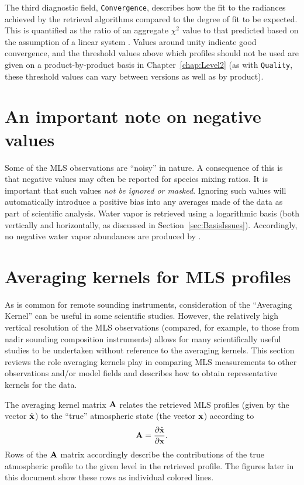 The third diagnostic field, \texttt{Convergence}, describes how the fit to the radiances achieved by the retrieval algorithms compared to the degree of fit to be expected. This is quantified as the ratio of an aggregate $\chi^2$ value to that predicted based on the assumption of a linear system \citep{LiveseyEtal:2006}. Values around unity indicate good convergence, and the threshold values above which profiles should not be used are given on a product-by-product basis in Chapter~\ref{chap:Level2} (as with \texttt{Quality}, these threshold values can vary between versions as well as by product).

\section{An important note on negative values}
\label{sec:NegativeValuesOK}

Some of the MLS observations are ``noisy'' in nature. A consequence of this is that negative values may often be reported for species mixing ratios. It is important that such values \emph{not be ignored or masked}. Ignoring such values will automatically introduce a positive bias into any averages made of the data as part of scientific analysis. Water vapor is retrieved using a logarithmic basis (both vertically and horizontally, as discussed in Section~\ref{sec:BasisIssues}). Accordingly, no negative water vapor abundances are produced by \thisv.

\section{Averaging kernels for MLS \thisv profiles}
\label{sec:AveragingKernels}
As is common for remote sounding instruments, consideration of the ``Averaging Kernel'' \citep[e.g.,][]{Rodgers:2000} can be useful in some scientific studies.  However, the relatively high vertical resolution of the MLS observations (compared, for example, to those from nadir sounding composition instruments) allows for many scientifically useful studies to be undertaken without reference to the averaging kernels.  This section reviews the role averaging kernels play in comparing MLS measurements to other observations and/or model fields and describes how to obtain representative kernels for the \thisv data.

The averaging kernel matrix $\mathbf{A}$ relates the retrieved MLS profiles (given by the vector $\hat{\mathbf{x}}$) to the ``true'' atmospheric state (the vector $\mathbf{x}$) according to
\begin{equation}
  \mathbf{A} = \frac{\partial\hat{\mathbf{x}}}{\partial\mathbf{x}}.
\end{equation}
Rows of the $\mathbf{A}$ matrix accordingly describe the contributions of the true atmospheric profile to the given level in the retrieved profile. The figures later in this document show these rows as individual colored lines.

